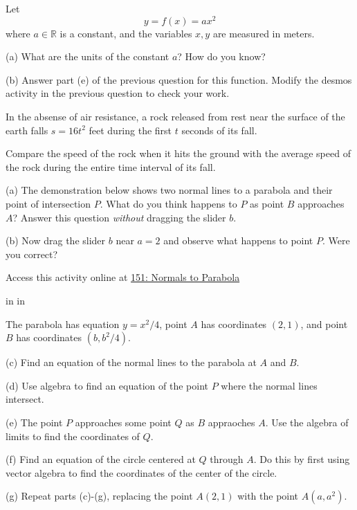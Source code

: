 \documentclass{ximera}
\newcommand{\pskip}{\vskip 0.1 in}
\begin{document}
\begin{question}  \label{Qerdfggg}
Let
\[
     y = f(x) = a x^2
\]
where $a\in \mathbb{R}$ is a constant, and the variables $x, y$ are measured in meters.

(a) What are the units of the constant $a$? How do you know?

(b) Answer part (e) of the previous question for this function. Modify the desmos activity in the previous question to check your work.
\end{question}


\begin{question}  \label{Qdfgbbvvd}
In the absense of air resistance, a rock released from rest near the surface of the earth falls $s=16t^2$ feet during the first $t$ seconds of its fall.

Compare the speed of the rock when it hits the ground with the average speed of the rock during the entire time interval of its fall.
\end{question}



\begin{question}  \label{Qwerdfggg}
(a) The demonstration below shows two normal lines to a parabola and their point of intersection $P$. What do you think happens to $P$ as point $B$ approaches $A$? Answer this question \emph{without} dragging the slider $b$.

(b) Now drag the slider $b$ near $a=2$ and observe what happens to point $P$. Were you correct? 


 
\begin{onlineOnly}
    \begin{center}
\end{center}
\end{onlineOnly}
Access this activity online at \href{https://www.desmos.com/calculator/ybaivhc2tl}{151: Normals to Parabola}

\pskip \pskip

The parabola has equation $y=x^2/4$, point $A$ has coordinates $(2,1)$, and point $B$ has coordinates $(b,b^2/4)$. 

(c) Find an equation of the normal lines to the parabola at $A$ and $B$.

(d) Use algebra to find an equation of the point $P$ where the normal lines intersect.

(e) The point $P$ approaches some point $Q$ as $B$ appraoches $A$. Use the algebra of limits to find the coordinates of $Q$.

(f) Find an equation of the circle centered at $Q$ through $A$. Do this by first using vector algebra to find the coordinates of the center of the circle.

(g) Repeat parts (c)-(g), replacing the point $A(2,1)$ with the point $A(a,a^2)$.


\end{question}
\end{document}
